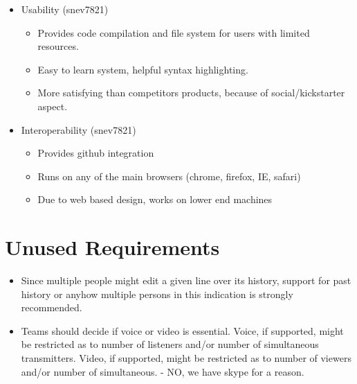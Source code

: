 \documentclass[11pt]{report}
\begin{document}
\begin{itemize}
        \item Usability (snev7821) \begin{itemize}
            \item Provides code compilation and file system for users with limited resources. 
            \item Easy to learn system, helpful syntax highlighting.
            \item More satisfying than competitors products, because of social/kickstarter aspect. \end{itemize}
        \item Interoperability (snev7821) \begin{itemize}
            \item Provides github integration
            \item Runs on any of the main browsers (chrome, firefox, IE, safari)
            \item Due to web based design, works on lower end machines \end{itemize}
    \end{itemize}

\section{Unused Requirements}
    \begin{itemize}
        \item Since multiple people might edit a given line over its history, support for past history or anyhow multiple persons in this indication is strongly recommended.
        \item Teams should decide if voice or video is essential. Voice, if supported, might be restricted as to number of listeners and/or number of simultaneous transmitters. Video, if supported, might be restricted as to number of viewers and/or number of simultaneous. - NO, we have skype for a reason.
    \end{itemize}
    
\end{document}
